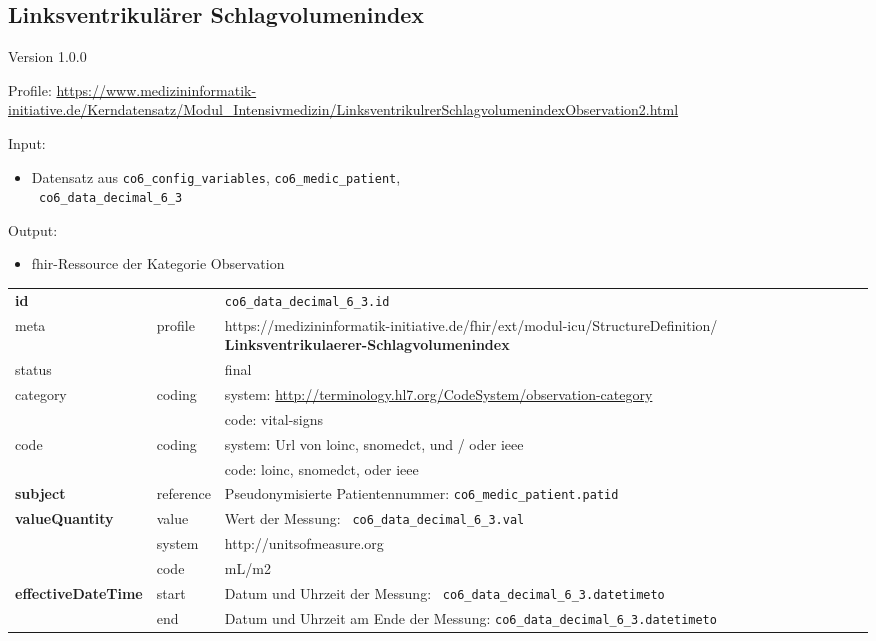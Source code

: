 \subsection{Linksventrikulärer Schlagvolumenindex} 
\noindent Version 1.0.0

\noindent Profile: \url{https://www.medizininformatik-initiative.de/Kerndatensatz/Modul_Intensivmedizin/LinksventrikulrerSchlagvolumenindexObservation2.html}

\noindent Input:
\begin{itemize}
	\item Datensatz aus \texttt{co6\_config\_variables}, \texttt{co6\_medic\_patient}, \\ \texttt{
co6\_data\_decimal\_6\_3}
\end{itemize}
Output:
\begin{itemize}
        \item \ac{fhir}-Ressource der Kategorie \glqq Observation\grqq{}
\end{itemize}
\begin{longtable}{|l|l|p{7.5cm}|}
        \hline
        \rowcolor{lightgray} \multicolumn{3}{|l|}{Data Mapping (inhaltlich)} \\ \hline
        \textbf{id} &  & \texttt{co6\_data\_decimal\_6\_3.id} \\ \hline
	meta & profile & https://medizininformatik-initiative.de/fhir/ext/modul-icu/StructureDefinition/\textbf{
Linksventrikulaerer-Schlagvolumenindex} \\ \hline 
	status &  & final   \\ \hline 
	category & coding & system: \url{http://terminology.hl7.org/CodeSystem/observation-category} \\
\cline{3-3}
	& & code: vital-signs \\ \hline
	code & coding & system: Url von \ac{loinc}, \ac{snomedct}, und / oder \ac{ieee} \\ 
	\cline{3-3} 
	 &  & code: \ac{loinc}, \ac{snomedct}, oder \ac{ieee} \\ \hline
	 \textbf{subject}  & reference & Pseudonymisierte Patientennummer: \texttt{co6\_medic\_patient.patid} \\ \hline
	 \textbf{valueQuantity}  & value & Wert der Messung: \texttt{
co6\_data\_decimal\_6\_3.val} \\
        \cline{2-3}
         & system & http://unitsofmeasure.org \\
         \cline{2-3}
         & code & mL/m2 \\ \hline
     \textbf{effectiveDateTime}  & start & Datum und Uhrzeit der Messung: \texttt{
co6\_data\_decimal\_6\_3.datetimeto} \\
    \cline{2-3}
     & end & Datum und Uhrzeit am Ende der Messung: \texttt{co6\_data\_decimal\_6\_3.datetimeto} \\ \hline
\end{longtable}


